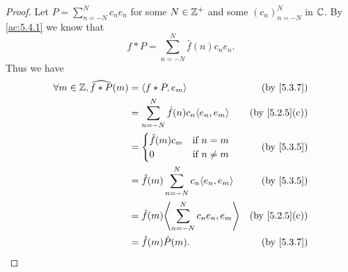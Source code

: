 \begin{proof}
  Let \(P = \sum_{n = -N}^N c_n e_n\) for some \(N \in \mathbb{Z}^+\) and some \((c_n)_{n = -N}^N\) in \(\mathbb{C}\).
  By \cref{ac:5.4.1} we know that
  \[
    f * P = \sum_{n = -N}^N \hat{f}(n) c_n e_n.
  \]
  Thus we have
  \begin{align*}
    \forall m \in \Z, \widehat{f * P}(m) & = \inner{f * P, e_m}                               & \text{(by \cref{5.3.7})}    \\
                                         & = \sum_{n = -N}^N \hat{f}(n) c_n \inner{e_n, e_m}  & \text{(by \cref{5.2.5}(c))} \\
                                         & = \begin{cases}
                                               \hat{f}(m) c_m & \text{if } n = m    \\
                                               0              & \text{if } n \neq m
                                             \end{cases}            & \text{(by \cref{5.3.5})}                              \\
                                         & = \hat{f}(m) \sum_{n = -N}^N c_n \inner*{e_n, e_m} & \text{(by \cref{5.3.5})}    \\
                                         & = \hat{f}(m) \inner*{\sum_{n = -N}^N c_n e_n, e_m} & \text{(by \cref{5.2.5}(c))} \\
                                         & = \hat{f}(m) \hat{P}(m).                           & \text{(by \cref{5.3.7})}
  \end{align*}


\end{proof}
